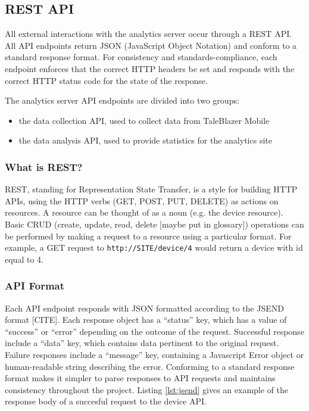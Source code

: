 \subsection{REST API}

All external interactions with the analytics server occur through a REST API. All API endpoints return JSON (JavaScript Object Notation) and conform to a standard response format. For consistency and standards-compliance, each endpoint enforces that the correct HTTP headers be set and responds with the correct HTTP status code for the state of the response.

The analytics server API endpoints are divided into two groups:
	\begin{itemize}
		\item the data collection API, used to collect data from TaleBlazer Mobile
		\item the data analysis API, used to provide statistics for the analytics site
	\end{itemize}


\subsubsection{What is REST?}
REST, standing for Representation State Transfer, is a style for building HTTP APIs, using the HTTP verbs (GET, POST, PUT, DELETE) as actions on resources. A resource can be thought of as a noun (e.g. the device resource). Basic CRUD (create, update, read, delete [maybe put in glossary]) operations can be performed by making a request to a resource using a particular format. For example, a GET request to \texttt{http://SITE/device/4} would return a device with id equal to 4. 

\subsubsection{API Format}

Each API endpoint responds with JSON formatted according to the JSEND format [CITE]. Each response object has a ``status'' key, which has a value of ``success'' or ``error'' depending on the outcome of the request. Successful response include a ``data'' key, which contains data pertinent to the original request. Failure responses include a ``message'' key, containing a Javascript Error object or human-readable string describing the error. Conforming to a standard response format makes it simpler to parse responses to API requests and maintains consistency throughout the project. Listing \ref{lst:jsend} gives an example of the response body of a succesful request to the device API.

